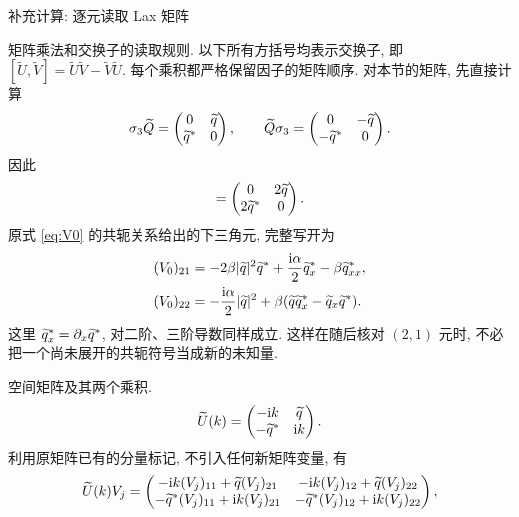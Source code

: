 \par\medskip\noindent 补充计算: 逐元读取 Lax 矩阵\par
\par\smallskip\noindent 矩阵乘法和交换子的读取规则.\quad
以下所有方括号均表示交换子, 即 $[\widetilde U,\widetilde V]=\widetilde U\widetilde V-\widetilde V\widetilde U$. 每个乘积都严格保留因子的矩阵顺序. 对本节的矩阵, 先直接计算
\begin{equation*}
\sigma_3\widetilde Q
=\begin{pmatrix}0&\widetilde q\\{\widetilde q}^{*}&0\end{pmatrix},
\qquad
\widetilde Q\sigma_3
=\begin{pmatrix}0&-\widetilde q\\-{\widetilde q}^{*}&0\end{pmatrix}.
\end{equation*}
因此
\begin{equation*}
[\sg,\widetilde Q]
=\begin{pmatrix}0&2\widetilde q\\2\conj{\widetilde q}&0\end{pmatrix}.
\end{equation*}
原式 \eqref{eq:V0} 的共轭关系给出的下三角元, 完整写开为
\begin{align*}
(V_0)_{21}
&=-2\beta|\widetilde q|^2{\widetilde q}^{*}
+\dfrac{\mathrm{i}\alpha}{2}{\widetilde q_x}^{*}
-\beta{\widetilde q_{xx}}^{*},\\
(V_0)_{22}
&=-\dfrac{\mathrm{i}\alpha}{2}|\widetilde q|^2
+\beta(\widetilde q{\widetilde q_x}^{*}
-\widetilde q_x{\widetilde q}^{*}).
\end{align*}
这里 ${\widetilde q_x}^{*}=\partial_x{\widetilde q}^{*}$, 对二阶、三阶导数同样成立. 这样在随后核对 $(2,1)$ 元时, 不必把一个尚未展开的共轭符号当成新的未知量.
\par\smallskip\noindent 空间矩阵及其两个乘积.\quad
\begin{equation*}
\widetilde U(k)
=\begin{pmatrix}
-\mathrm{i} k&\widetilde q\\
-{\widetilde q}^{*}&\mathrm{i} k
\end{pmatrix}.
\end{equation*}
利用原矩阵已有的分量标记, 不引入任何新矩阵变量, 有
\begin{equation*}
\widetilde U(k)V_j=
\begin{pmatrix}
-\mathrm{i} k(V_j)_{11}+\widetilde q(V_j)_{21}
&-\mathrm{i} k(V_j)_{12}+\widetilde q(V_j)_{22}\\
-{\widetilde q}^{*}(V_j)_{11}+\mathrm{i} k(V_j)_{21}
&-{\widetilde q}^{*}(V_j)_{12}+\mathrm{i} k(V_j)_{22}
\end{pmatrix},
\end{equation*}

